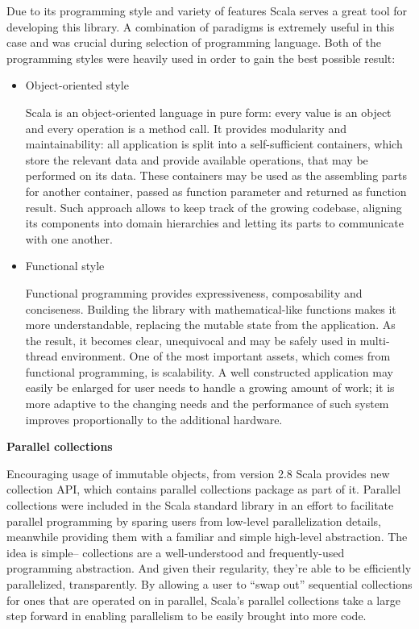 
Due to its programming style and variety of features Scala serves a great tool for developing this library. A combination of paradigms is extremely useful in this case and was crucial during selection of programming language. Both of the programming styles were heavily used in order to gain the best possible result:
\begin{itemize}
\item
Object-oriented style

Scala is an object-oriented language in pure form: every value is an object and every operation is a method call. \cite{programming_in_scala} It provides modularity and maintainability: all application is split into a self-sufficient containers, which store the relevant data and provide available operations, that may be performed on its data. These containers may be used as the assembling parts for another container, passed as function parameter and returned as function result. Such approach allows to keep track of the growing codebase, aligning its components into domain hierarchies and letting its parts to communicate with one another.

\item
Functional style

Functional programming provides expressiveness, composability and conciseness. Building the library with mathematical-like functions makes it more understandable, replacing the mutable state from the application. As the result, it becomes clear, unequivocal and may be safely used in multi-thread environment. One of the most important assets, which comes from functional programming, is scalability. A well constructed application may easily be enlarged for user needs to handle a growing amount of work; it is more adaptive to the changing needs and the performance of such system improves proportionally to the additional hardware.

\end{itemize} 

 \textbf{Parallel collections}

 Encouraging usage of immutable objects, from version 2.8 Scala provides new collection API, which contains parallel collections package as part of it. Parallel collections were included in the Scala standard library in an effort to facilitate parallel programming by sparing users from low-level parallelization details, meanwhile providing them with a familiar and simple high-level abstraction. The idea is simple– collections are a well-understood and frequently-used programming abstraction. And given their regularity, they’re able to be efficiently parallelized, transparently. By allowing a user to “swap out” sequential collections for ones that are operated on in parallel, Scala’s parallel collections take a large step forward in enabling parallelism to be easily brought into more code. \cite{scala_parallel_collections_overview}

